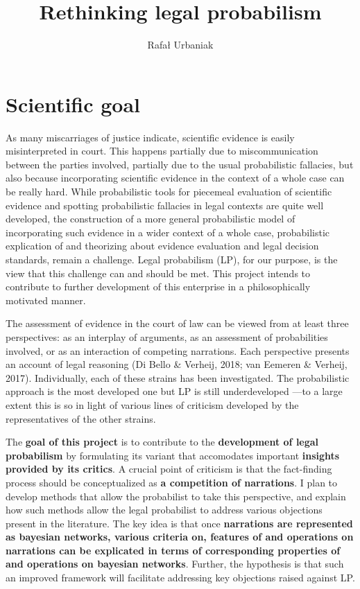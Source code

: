 \documentclass[11pt,dvipsnames,enabledeprecatedfontcommands]{scrartcl}
\title{Rethinking legal probabilism}
\author{Rafał Urbaniak}
\date{}
\begin{document}
\maketitle

\thispagestyle{empty}

\section{Scientific goal}\label{scientific-goal}

As many miscarriages of justice indicate, scientific evidence is easily
misinterpreted in court. This happens partially due to miscommunication
between the parties involved, partially due to the usual probabilistic
fallacies, but also because incorporating scientific evidence in the
context of a whole case can be really hard. While probabilistic tools
for piecemeal evaluation of scientific evidence and spotting
probabilistic fallacies in legal contexts are quite well
developed,
the construction of a more general probabilistic model of incorporating
such evidence in a wider context of a whole case, probabilistic
explication of and theorizing about evidence evaluation and legal
decision standards, remain a challenge. Legal probabilism (LP), for our
purpose, is the view that this challenge can and should be met. This
project intends to contribute to further development of this enterprise
in a philosophically motivated manner.

The assessment of evidence in the court of law can be viewed from at
least three perspectives: as an interplay of arguments, as an assessment
of probabilities involved, or as an interaction of competing narrations.
Each perspective presents an account of legal reasoning (Di Bello \&
Verheij, 2018; van Eemeren \& Verheij, 2017). Individually, each of
these strains has been investigated. The probabilistic approach is the
most developed one but LP is still underdeveloped ---to a large extent
this is so in light of various lines of criticism developed by the
representatives of the other strains.

The \textbf{goal of this project} is to contribute to the
\textbf{development of legal probabilism} by formulating its variant
that accomodates important \textbf{insights provided by its critics}. A
crucial point of criticism is that the fact-finding process should be
conceptualized as \textbf{a competition of narrations}. I plan to
develop methods that allow the probabilist to take this perspective, and
explain how such methods allow the legal probabilist to address various
objections present in the literature. The key idea is that once
\textbf{narrations are represented as bayesian networks, various criteria on,  features of  and operations on narrations can be explicated in terms of corresponding properties of and operations on bayesian networks}.
Further, the hypothesis is that such an improved framework will
facilitate addressing key objections raised against LP.
\end{document}
